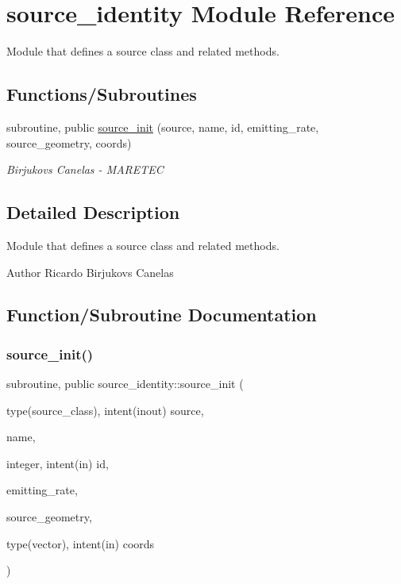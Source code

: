 \hypertarget{namespacesource__identity}{}\section{source\+\_\+identity Module Reference}
\label{namespacesource__identity}


Module that defines a source class and related methods.  


\subsection*{Functions/\+Subroutines}
\begin{DoxyCompactItemize}
\item 
subroutine, public \mbox{\hyperlink{namespacesource__identity_acc9ae0204f68acff7c8db0a66c19ec5e}{source\+\_\+init}} (source, name, id, emitting\+\_\+rate, source\+\_\+geometry, coords)
\begin{DoxyCompactList}\small\item\em Birjukovs Canelas -\/ M\+A\+R\+E\+T\+EC \end{DoxyCompactList}\end{DoxyCompactItemize}


\subsection{Detailed Description}
Module that defines a source class and related methods. 

\begin{DoxyAuthor}{Author}
Ricardo Birjukovs Canelas 
\end{DoxyAuthor}


\subsection{Function/\+Subroutine Documentation}
\mbox{\label{namespacesource__identity_acc9ae0204f68acff7c8db0a66c19ec5e}} 
\subsubsection{\texorpdfstring{source\+\_\+init()}{source\_init()}}
{\footnotesize\ttfamily subroutine, public source\+\_\+identity\+::source\+\_\+init (\begin{DoxyParamCaption}\item[{type(source\+\_\+class), intent(inout)}]{source,  }\item[{}]{name,  }\item[{integer, intent(in)}]{id,  }\item[{}]{emitting\+\_\+rate,  }\item[{}]{source\+\_\+geometry,  }\item[{type(vector), intent(in)}]{coords }\end{DoxyParamCaption})}



